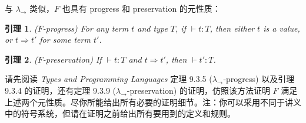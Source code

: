 \documentclass[11pt, a4paper]{article}
\newtheorem{lemma}{引理}
\let\to\rightarrow
\let\reduce\Rightarrow
\begin{document}
与 $\lambda_\to$ 类似，$F$ 也具有 progress 和 preservation 的元性质：

\begin{lemma}
    ($F$-progress) For any term $t$ and type $T$, if $\vdash t : T$,
    then either $t$ is a value, or $t \reduce t'$ for some term $t'$.
\end{lemma}

\begin{lemma}
    ($F$-preservation) If $\vdash t:T$ and $t \reduce t'$, then $\vdash t':T$.
\end{lemma}

请先阅读 \textit{Types and Programming Languages} 定理 9.3.5 ($\lambda_\to$-progress) 以及引理 9.3.4 的证明，还有定理 9.3.9 ($\lambda_\to$-preservation) 的证明，仿照该方法证明 $F$ 满足上述两个元性质。尽你所能给出所有必要的证明细节。注：你可以采用不同于讲义中的符号系统，但请在证明之前给出所有要用到的定义和规则。
\end{document}
